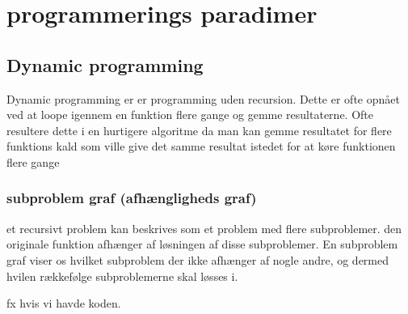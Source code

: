 \documentclass[letterpaper,10pt,danish]{sphinxmanual}
\begin{document}
\sphinxstepscope


\section{programmerings paradimer}
\label{\detokenize{Algorithmer/Dynamic:programmerings-paradimer}}\label{\detokenize{Algorithmer/Dynamic::doc}}

\subsection{Dynamic programming}
\label{\detokenize{Algorithmer/Dynamic:dynamic-programming}}
\sphinxAtStartPar
Dynamic programming er er programming uden recursion. Dette er ofte opnået ved at loope igennem en funktion flere gange og gemme resultaterne. Ofte resultere dette i en hurtigere algoritme da man kan gemme resultatet for flere funktions kald som ville give det samme resultat istedet for at køre funktionen flere gange


\subsubsection{subproblem graf (afhængligheds graf)}
\label{\detokenize{Algorithmer/Dynamic:subproblem-graf-afhaengligheds-graf}}
\sphinxAtStartPar
et recursivt problem kan beskrives som et problem med flere subproblemer. den originale funktion afhænger af løsningen af disse subproblemer. En subproblem graf viser os hvilket subproblem der ikke afhænger af nogle andre, og dermed hvilen rækkefølge subproblemerne skal løsses i.

\sphinxAtStartPar
fx hvis vi havde koden.

\begin{sphinxVerbatim}[commandchars=\\\{\}]
   
       
         
       
         
     
\end{sphinxVerbatim}
\end{document}
